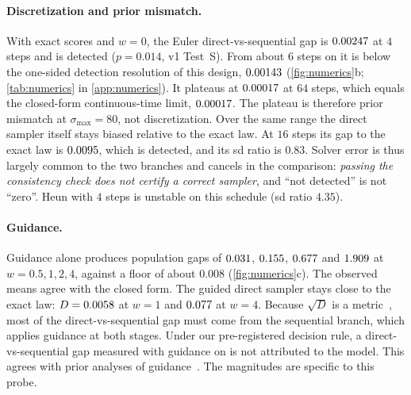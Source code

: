 \documentclass{article}
\theoremstyle{plain}
\theoremstyle{definition}
\theoremstyle{remark}
\begin{document}
\paragraph{Discretization and prior mismatch.}
With exact scores and $w=0$, the Euler direct-vs-sequential gap is $0.00247$ at $4$ steps and is detected ($p=0.014$, v1 Test~S).
From about $6$ steps on it is below the one-sided detection resolution of this design, $0.00143$ (\cref{fig:numerics}b; \cref{tab:numerics} in \cref{app:numerics}). It plateaus at $0.00017$ at $64$ steps, which equals the closed-form continuous-time limit, $0.00017$. The plateau is therefore prior mismatch at $\sigma_{\max}=80$, not discretization.
Over the same range the direct sampler itself stays biased relative to the exact law. At $16$ steps its gap to the exact law is $0.0095$, which is detected, and its sd ratio is $0.83$.
Solver error is thus largely common to the two branches and cancels in the comparison: \emph{passing the consistency check does not certify a correct sampler}, and ``not detected'' is not ``zero''.
Heun with $4$ steps is unstable on this schedule (sd ratio $4.35$).

\paragraph{Guidance.}
Guidance alone produces population gaps of $0.031$, $0.155$, $0.677$ and $1.909$ at $w=0.5,1,2,4$, against a floor of about $0.008$ (\cref{fig:numerics}c). The observed means agree with the closed form.
The guided direct sampler stays close to the exact law: $D=0.0058$ at $w=1$ and $0.077$ at $w=4$. Because $\sqrt{D}$ is a metric~\citep{szekely2013energy}, most of the direct-vs-sequential gap must come from the sequential branch, which applies guidance at both stages.
Under our pre-registered decision rule, a direct-vs-sequential gap measured with guidance on is not attributed to the model.
This agrees with prior analyses of guidance~\citep{chidambaram2024guidance,bradley2024cfg}. The magnitudes are specific to this probe.
\end{document}
